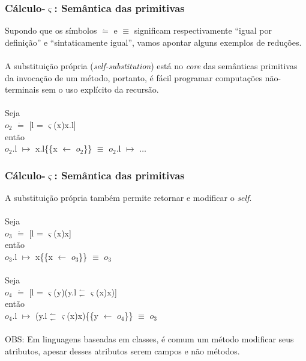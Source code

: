 \documentclass[10pt, compress]{beamer}
\begin{document}
\begin{frame}[fragile]
  \frametitle{Cálculo-$\varsigma$: Semântica das primitivas}
  Supondo que os símbolos $\dot{=}$ e $\equiv$  significam respectivamente ``igual por definição'' e ``sintaticamente igual'',
  vamos apontar alguns exemplos de reduções.
  \\~\\
  A substituição própria (\textit{self-substitution}) está no \textit{core} das semânticas primitivas da invocação de um método, 
  portanto, é fácil programar computações não-terminais sem o uso explícito da recursão.
  \\~\\
  Seja
  \\ 
  $o_{2}$ $\dot{=}$ [l = $\varsigma$(x)x.l]
  \\
  então 
  \\
  $o_{2}$.l $\mapsto$ x.l\{\{x $\leftarrow$ $o_{2}$\}\} $\equiv$ $o_{2}$.l $\mapsto$ $\ldots$
\end{frame}

\begin{frame}[fragile]
  \frametitle{Cálculo-$\varsigma$: Semântica das primitivas}
  A substituição própria também permite retornar e modificar o \textit{self}.
  \\~\\
  Seja
  \\
  $o_{3}$ $\dot{=}$ [l = $\varsigma$(x)x]
  \\
  então
  \\
  $o_{3}$.l $\mapsto$ x\{\{x $\leftarrow$ $o_{3}$\}\} $\equiv$ $o_{3}$
  \\~\\
  Seja
  \\
  $o_{4}$ $\dot{=}$ [l = $\varsigma$(y)(y.l $^{\leftharpoonup}_{\leftharpoondown}$ $\varsigma$(x)x)]
  \\
  então
  \\
  $o_{4}$.l $\mapsto$ (y.l  $^{\leftharpoonup}_{\leftharpoondown}$  $\varsigma$(x)x)\{\{y $\leftarrow$ $o_{4}$\}\} $\equiv$ $o_{3}$
  \\~\\
  OBS: Em linguagens baseadas em classes, é comum um método modificar seus atributos, apesar desses atributos serem campos e não
  métodos.
\end{frame}
\end{document}
